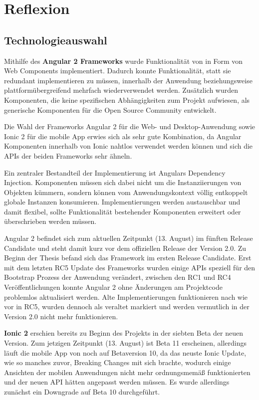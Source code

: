 
\chapter{Reflexion}

\label{chap:reflexion}

\section{Technologieauswahl}

Mithilfe des \textbf{Angular 2 Frameworks} wurde Funktionalität von \projectname{} in Form von
Web Components implementiert.
Dadurch konnte Funktionalität, statt sie redundant implementieren zu müssen, innerhalb der
Anwendung beziehungsweise plattformübergreifend mehrfach wiederverwendet werden.
Zusätzlich wurden Komponenten, die keine spezifischen Abhängigkeiten zum Projekt aufwiesen, als
generische Komponenten für die Open Source Community entwickelt.

Die Wahl der Frameworks Angular 2 für die Web- und Desktop-Anwendung sowie Ionic 2 für
die mobile App erwies sich als sehr gute Kombination,
da Angular Komponenten innerhalb von Ionic nahtlos verwendet werden können
und sich die APIs der beiden Frameworks sehr ähneln.

Ein zentraler Bestandteil der Implementierung ist Angulars Dependency Injection.
Komponenten müssen sich dabei nicht um die Instanziierungen von Objekten kümmern,
sondern können vom Anwendungskontext völlig entkoppelt globale Instanzen konsumieren.
Implementierungen werden austauschbar und damit flexibel,
sollte Funktionalität bestehender Komponenten erweitert oder überschrieben werden müssen.

Angular 2 befindet sich zum aktuellen Zeitpunkt (13. August) im fünften Release Candidate und steht damit kurz
vor dem offiziellen Release der Version 2.0. Zu Beginn der Thesis befand sich das Framework im ersten Release Candidate.
Erst mit dem letzten RC5 Update des Frameworks wurden einige APIs speziell für den Bootstrap Prozess der Anwendung verändert,
zwischen den RC1 und RC4 Veröffentlichungen konnte Angular 2 ohne Änderungen am Projektcode problemlos
aktualisiert werden. Alte Implementierungen funktionieren nach wie vor in RC5,
wurden dennoch als veraltet markiert und werden vermutlich in der Version 2.0 nicht mehr
funktionieren.


\textbf{Ionic 2} erschien bereits zu Beginn des Projekts in der siebten Beta der neuen Version.
Zum jetzigen Zeitpunkt (13. August) ist Beta 11 erscheinen, allerdings läuft die mobile App von
\projectname{} noch auf Betaversion 10, da das neuste Ionic Update,
wie so manches zuvor, Breaking Changes mit sich brachte, wodurch einige Ansichten der
mobilen Anwendungen nicht mehr ordnungsmemäß funktionierten und der neuen API hätten angepasst werden müssen.
Es wurde allerdings zunächst ein Downgrade auf Beta 10 durchgeführt.

